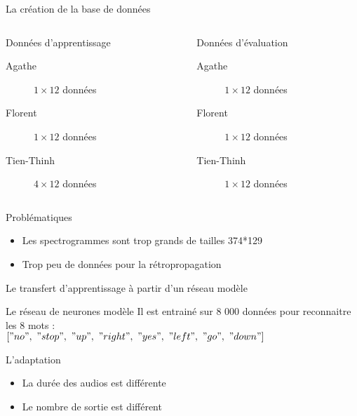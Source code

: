 \begin{frame}{La création de la base de données}
	\begin{columns}[T]
		\begin{column}[]{0.45\textwidth}
			\begin{exampleblock}{Données d'apprentissage}
				\begin{description}
					\item[Agathe]  $1\times12$ données
					\item[Florent]  $1\times12$ données
					\item[Tien-Thinh]  $4\times12$ données
				\end{description}
			\end{exampleblock}
		\end{column}
		\begin{column}[]{0.45\textwidth}
			\begin{alertblock}{Données d'évaluation}
				\begin{description}
					\item[Agathe]  $1\times12$ données
					\item[Florent]  $1\times12$ données
					\item[Tien-Thinh]  $1\times12$ données
				\end{description}
			\end{alertblock}
		\end{column}
	\end{columns}
	\begin{block}{Problématiques}
		\begin{itemize}
			\item Les spectrogrammes sont trop grands de tailles 374*129
			\item Trop peu de données pour la rétropropagation
		\end{itemize}
	\end{block}
\end{frame}




\begin{frame}{Le transfert d'apprentissage à partir d'un réseau modèle}
	\begin{block}{Le réseau de neurones modèle}
		Il est entrainé sur 8 000 données pour reconnaitre les $8$ mots : \\
		$["no",\ "stop",\ "up",\ "right",\ "yes",\ "left",\ "go",\ "down"]$ \\
	\end{block}
	\begin{exampleblock}{L'adaptation}
		\begin{itemize}
			\item La durée des audios est différente
			\item Le nombre de sortie est différent
		\end{itemize}
	\end{exampleblock}
\end{frame}



